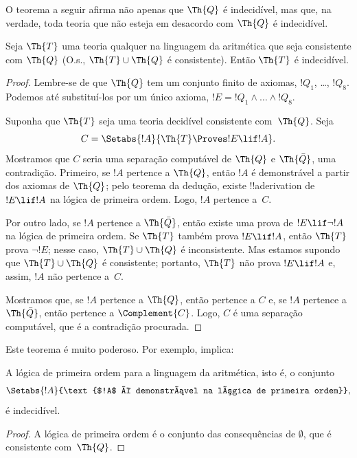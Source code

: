 \documentclass[../../../include/open-logic-section]{subfiles}
\begin{document}


O teorema a seguir afirma não apenas que $\Th{Q}$ é indecidível, mas
que, na verdade, toda teoria que não esteja em desacordo com $\Th{Q}$
é indecidível.

\begin{thm}
Seja $\Th{T}$ uma teoria qualquer na linguagem da aritmética que seja
consistente com $\Th{Q}$ (O.s.\@, $\Th{T} \cup \Th{Q}$ é consistente).
Então $\Th{T}$ é indecidível.
\end{thm}

\begin{proof}
Lembre-se de que $\Th{Q}$ tem um conjunto finito de axiomas, $!Q_1$,
\dots, $!Q_8$. Podemos até substituí-los por um único axioma,
$!E = !Q_1 \land \dots \land !Q_8$.

Suponha que $\Th{T}$ seja uma teoria decidível consistente
com~$\Th{Q}$. Seja
\[
C = \Setabs{!A}{\Th{T} \Proves !E \lif !A}.
\]
Mostramos que $C$ seria uma separação computável de $\Th{Q}$ e
$\Th{\bar Q}$, uma contradição. Primeiro, se $!A$ pertence a $\Th{Q}$,
então $!A$ é demonstrável a partir dos axiomas de $\Th{Q}$; pelo
teorema da dedução, existe !!a{derivation} de $!E \lif !A$ na lógica de
primeira ordem. Logo, $!A$ pertence a~$C$.

Por outro lado, se $!A$ pertence a $\Th{\bar Q}$, então existe uma
prova de $!E \lif \lnot !A$ na lógica de primeira ordem. Se $\Th{T}$
também prova $!E \lif !A$, então $\Th{T}$ prova $\lnot !E$; nesse caso,
$\Th{T} \cup \Th{Q}$ é inconsistente. Mas estamos supondo que
$\Th{T} \cup \Th{Q}$ é consistente; portanto, $\Th{T}$ não prova
$!E \lif !A$ e, assim, $!A$ não pertence a~$C$.

Mostramos que, se $!A$ pertence a $\Th{Q}$, então pertence a $C$ e,
se $!A$ pertence a $\Th{\bar Q}$, então pertence a $\Complement{C}$.
Logo, $C$ é uma separação computável, que é a contradição procurada.
\end{proof}

Este teorema é muito poderoso. Por exemplo, implica:

\begin{cor}
  A lógica de primeira ordem para a linguagem da aritmética, isto é, o conjunto
  \[
    \Setabs{!A}{\text{$!A$ é demonstrável na lógica de primeira ordem}},
  \]
  é indecidível.
\end{cor}

\begin{proof}
A lógica de primeira ordem é o conjunto das consequências de
$\emptyset$, que é consistente com~$\Th{Q}$.
\end{proof}
\end{document}
